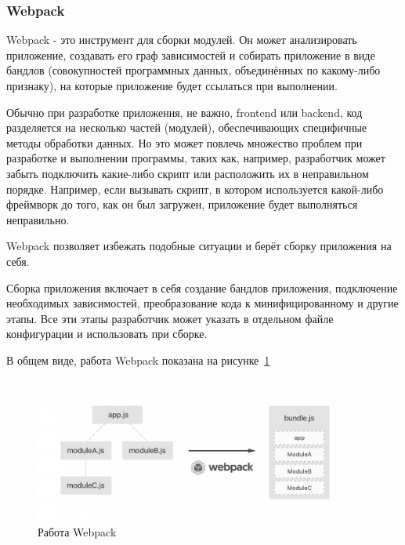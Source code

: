\subsubsection{Webpack}
Webpack - это инструмент для сборки модулей. Он может анализировать приложение, создавать его граф зависимостей и собирать приложение в виде бандлов (совокупностей программных данных, объединённых по какому-либо признаку), на которые приложение будет ссылаться при выполнении.

Обычно при разработке приложения, не важно, frontend или backend, код разделяется на несколько частей (модулей), обеспечивающих специфичные методы обработки данных. Но это может повлечь множество проблем при разработке и выполнении программы, таких как, например, разработчик может забыть подключить какие-либо скрипт или расположить их в неправильном порядке. Например, если вызывать скрипт, в котором используется какой-либо фреймворк до того, как он был загружен, приложение будет выполняться неправильно.

Webpack позволяет избежать подобные ситуации и берёт сборку приложения на себя.

Сборка приложения включает в себя создание бандлов приложения, подключение необходимых зависимостей, преобразование кода к минифицированному и другие этапы. Все эти этапы разработчик может указать в отдельном файле конфигурации и использовать при сборке.

В общем виде, работа Webpack показана на рисунке~\ref{img:webpack}

\begin{figure}[H]
  \centering
  \includegraphics[width=0.95\textwidth]{assets/images/theoretical/webpack.jpg}
  \caption{Работа Webpack}
  \label{img:webpack}
\end{figure}